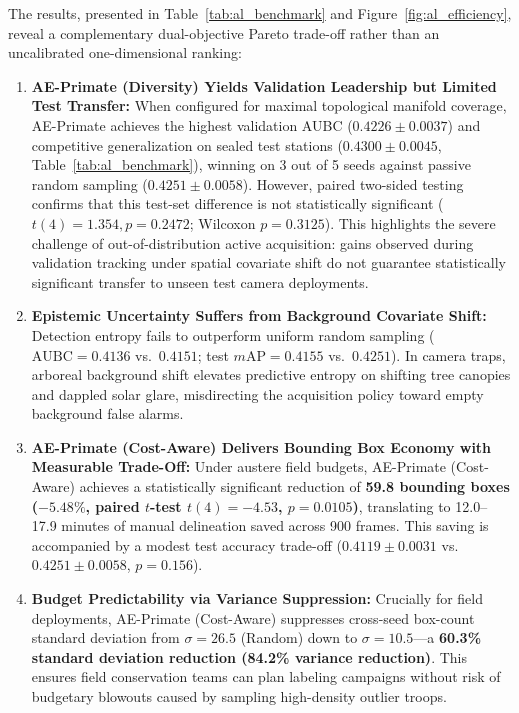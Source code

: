 \documentclass[conference]{IEEEtran}
\begin{document}
The results, presented in Table~\ref{tab:al_benchmark} and Figure~\ref{fig:al_efficiency}, reveal a complementary dual-objective Pareto trade-off rather than an uncalibrated one-dimensional ranking:
\begin{enumerate}
  \item \textbf{AE-Primate (Diversity) Yields Validation Leadership but Limited Test Transfer:} When configured for maximal topological manifold coverage, AE-Primate achieves the highest validation AUBC ($0.4226 \pm 0.0037$) and competitive generalization on sealed test stations ($0.4300 \pm 0.0045$, Table~\ref{tab:al_benchmark}), winning on 3 out of 5 seeds against passive random sampling ($0.4251 \pm 0.0058$). However, paired two-sided testing confirms that this test-set difference is not statistically significant ($t(4) = 1.354, p = 0.2472$; Wilcoxon $p = 0.3125$). This highlights the severe challenge of out-of-distribution active acquisition: gains observed during validation tracking under spatial covariate shift do not guarantee statistically significant transfer to unseen test camera deployments.
  \item \textbf{Epistemic Uncertainty Suffers from Background Covariate Shift:} Detection entropy fails to outperform uniform random sampling ($\text{AUBC} = 0.4136$ vs.\ $0.4151$; test $m\text{AP} = 0.4155$ vs.\ $0.4251$). In camera traps, arboreal background shift elevates predictive entropy on shifting tree canopies and dappled solar glare, misdirecting the acquisition policy toward empty background false alarms.
  \item \textbf{AE-Primate (Cost-Aware) Delivers Bounding Box Economy with Measurable Trade-Off:} Under austere field budgets, AE-Primate (Cost-Aware) achieves a statistically significant reduction of \textbf{59.8 bounding boxes ($-5.48\%$, paired $t$-test $t(4) = -4.53$, $p = 0.0105$)}, translating to 12.0--17.9 minutes of manual delineation saved across 900 frames. This saving is accompanied by a modest test accuracy trade-off ($0.4119 \pm 0.0031$ vs.\ $0.4251 \pm 0.0058$, $p = 0.156$).
  \item \textbf{Budget Predictability via Variance Suppression:} Crucially for field deployments, AE-Primate (Cost-Aware) suppresses cross-seed box-count standard deviation from $\sigma = 26.5$ (Random) down to $\sigma = 10.5$---a \textbf{60.3\% standard deviation reduction (84.2\% variance reduction)}. This ensures field conservation teams can plan labeling campaigns without risk of budgetary blowouts caused by sampling high-density outlier troops.
\end{enumerate}
\end{document}
